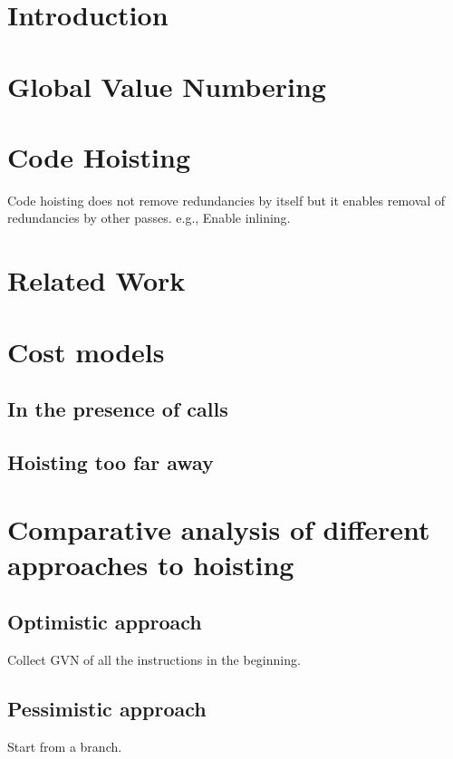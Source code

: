 \section{Introduction}

\section{Global Value Numbering}
\section{Code Hoisting}
Code hoisting does not remove redundancies by itself but it enables removal of redundancies by other passes.
e.g., Enable inlining.
\section{Related Work}

\section{Cost models}
\subsection{In the presence of calls}
\subsection{Hoisting too far away}

\section{Comparative analysis of different approaches to hoisting}
\subsection{Optimistic approach}
Collect GVN of all the instructions in the beginning.
\subsection{Pessimistic approach}
Start from a branch.


